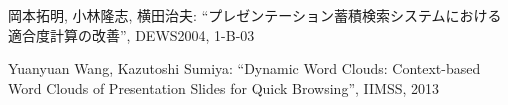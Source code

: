 \documentclass{js}
\begin{document}
\begin{thebibliography}{99}




 岡本拓明, 小林隆志, 横田治夫:
``プレゼンテーション蓄積検索システムにおける適合度計算の改善'',
DEWS2004, 1-B-03

 Yuanyuan Wang, Kazutoshi Sumiya:
``Dynamic Word Clouds: Context-based Word Clouds of Presentation Slides for Quick Browsing'',
IIMSS, 2013


\end{thebibliography}
\end{document}
